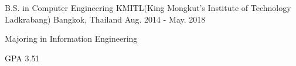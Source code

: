 

\begin{cventries}

    \cventry
    {B.S. in Computer Engineering} %
    {KMITL(King Mongkut's Institute of Technology Ladkrabang)} %
    {Bangkok, Thailand} %
    {Aug. 2014 - May. 2018} %
    {
    \begin{cvitems} %
        \item {Majoring in Information Engineering}
        \item {GPA 3.51}
    \end{cvitems}
    }

\end{cventries}
